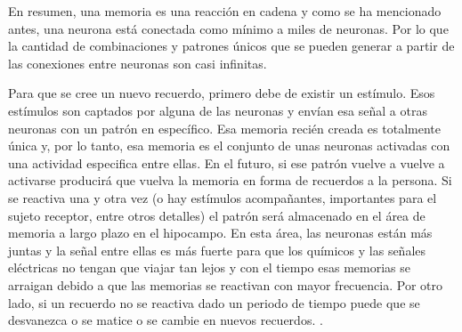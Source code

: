\begin{itemize}
En resumen, una memoria es una reacción en cadena y como se ha mencionado antes, una neurona está conectada como mínimo a miles de neuronas. Por lo que la cantidad de combinaciones y patrones únicos que se pueden generar a partir de las conexiones entre neuronas son casi infinitas\cite{brainmemory}. 
\newline

Para que se cree un nuevo recuerdo, primero debe de existir un estímulo. Esos estímulos son captados por alguna de las neuronas y envían esa señal a otras neuronas con un patrón en específico. Esa memoria recién creada es totalmente única y, por lo tanto, esa memoria es el conjunto de unas neuronas activadas con una actividad especifica entre ellas. En el futuro, si ese patrón vuelve a vuelve a activarse producirá que vuelva la memoria en forma de recuerdos a la persona. Si se reactiva una y otra vez (o hay estímulos acompañantes, importantes para el sujeto receptor, entre otros detalles) el patrón será almacenado en el área de memoria a largo plazo en el hipocampo. En esta área, las neuronas están más juntas y la señal entre ellas es más fuerte para que los químicos y las señales eléctricas no tengan que viajar tan lejos y con el tiempo esas memorias se arraigan debido a que las memorias se reactivan con mayor frecuencia. Por otro lado, si un recuerdo no se reactiva dado un periodo de tiempo puede que se desvanezca o se matice o se cambie en nuevos recuerdos. \cite{brainmemory}.
\end{itemize}